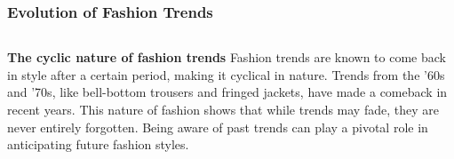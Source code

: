 \documentclass[5pt]{beamer}
\begin{document}
\begin{frame}
\frametitle{Evolution of Fashion Trends}
\begin{columns}
\begin{column}{0.7\textwidth}
\begin{block}{\textbf{The cyclic nature of fashion trends}}
Fashion trends are known to come back in style after a certain period, making it cyclical in nature. Trends from the '60s and '70s, like bell-bottom trousers and fringed jackets, have made a comeback in recent years. This nature of fashion shows that while trends may fade, they are never entirely forgotten. Being aware of past trends can play a pivotal role in anticipating future fashion styles.
\end{block}
\end{column}
\end{columns}
\end{frame}
\end{document}
